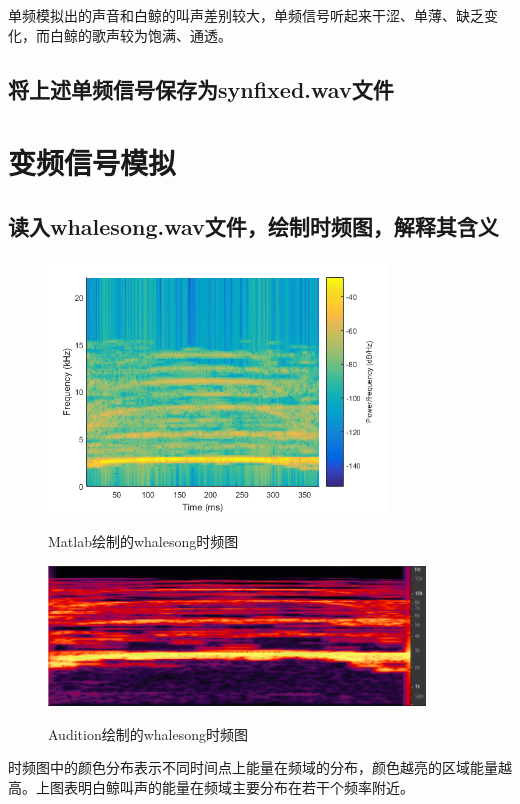 \documentclass{article}
\begin{document}
            单频模拟出的声音和白鲸的叫声差别较大，单频信号听起来干涩、单薄、缺乏变化，而白鲸的歌声较为饱满、通透。

        \subsection{将上述单频信号保存为synfixed.wav文件}

    \section{变频信号模拟}
        \subsection{读入whalesong.wav文件，绘制时频图，解释其含义}
            \begin{figure}[htb]
                \centering
                \includegraphics[width=9cm]{figure5.png}
                \label{fig:originft-1}\caption{Matlab绘制的whalesong时频图}
            \end{figure}

            \begin{figure}[!htb]
                \centering
                \includegraphics[width=10cm]{figure6.png}
                \label{fig:originft-2}\caption{Audition绘制的whalesong时频图}
            \end{figure}

            时频图中的颜色分布表示不同时间点上能量在频域的分布，颜色越亮的区域能量越高。上图表明白鲸叫声的能量在频域主要分布在若干个频率附近。
\end{document}
